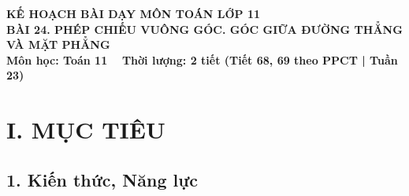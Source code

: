 \documentclass[12pt, a4paper]{article}
\begin{document}
\begin{center}
    {\fontsize{14pt}{17pt}\selectfont \textbf{KẾ HOẠCH BÀI DẠY MÔN TOÁN LỚP 11}}\\[6pt]
    {\fontsize{16pt}{19pt}\selectfont \textbf{BÀI 24. PHÉP CHIẾU VUÔNG GÓC. GÓC GIỮA ĐƯỜNG THẲNG VÀ MẶT PHẲNG}}\\[4pt]
    {\fontsize{12pt}{15pt}\selectfont \textbf{Môn học: Toán 11} \ \textbar \ \textbf{Thời lượng: 2 tiết (Tiết 68, 69 theo PPCT | Tuần 23)}}
\end{center}

\vspace{5pt}

\section*{I. MỤC TIÊU}

\subsection*{1. Kiến thức, Năng lực}
\end{document}

